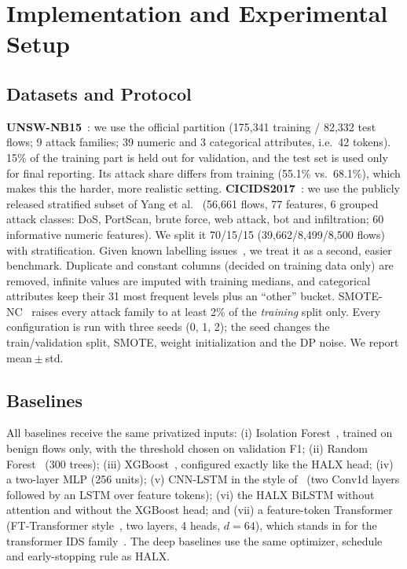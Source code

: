 \section{Implementation and Experimental Setup}
\label{sec:exp}
\subsection{Datasets and Protocol}
\textbf{UNSW-NB15}~\cite{moustafa2015unsw}: we use the official partition
(175{,}341 training / 82{,}332 test flows; 9 attack families; 39 numeric
and 3 categorical attributes, i.e.\ 42 tokens). 15\% of the training part
is held out for validation, and the test set is used only for final
reporting. Its attack share differs from training (55.1\% vs.\ 68.1\%),
which makes this the harder, more realistic setting.
\textbf{CICIDS2017}~\cite{sharafaldin2018cicids}: we use the publicly
released stratified subset of Yang et al.~\cite{yang2022mthids}
(56{,}661 flows, 77 features, 6 grouped attack classes: DoS, PortScan,
brute force, web attack, bot and infiltration; 60 informative numeric
features). We split it 70/15/15 (39{,}662/8{,}499/8{,}500 flows) with
stratification. Given known labelling issues~\cite{engelen2021troubleshooting},
we treat it as a second, easier benchmark.
Duplicate and constant columns (decided on training data only) are removed,
infinite values are imputed with training medians, and categorical
attributes keep their 31 most frequent levels plus an ``other'' bucket.
SMOTE-NC~\cite{chawla2002smote} raises every attack family to at least 2\% of
the \emph{training} split only. Every configuration is run with three seeds
(0, 1, 2); the seed changes the train/validation split, SMOTE, weight
initialization and the DP noise. We report mean${}\pm{}$std.


\subsection{Baselines}
All baselines receive the same privatized inputs:
(i) Isolation Forest~\cite{liu2008iforest}, trained on benign flows only, with
the threshold chosen on validation F1;
(ii) Random Forest~\cite{breiman2001rf} (300 trees);
(iii) XGBoost~\cite{chen2016xgboost}, configured exactly like the HALX head;
(iv) a two-layer MLP (256 units);
(v) CNN-LSTM in the style of~\cite{halbouni2022cnnlstm} (two Conv1d layers
followed by an LSTM over feature tokens);
(vi) the HALX BiLSTM without attention and without the XGBoost head; and
(vii) a feature-token Transformer (FT-Transformer style~\cite{gorishniy2021revisiting},
two layers, 4 heads, $d=64$), which stands in for the transformer IDS
family~\cite{wu2022rtids,manocchio2024flowtransformer}. The deep baselines
use the same optimizer, schedule and early-stopping rule as HALX.


